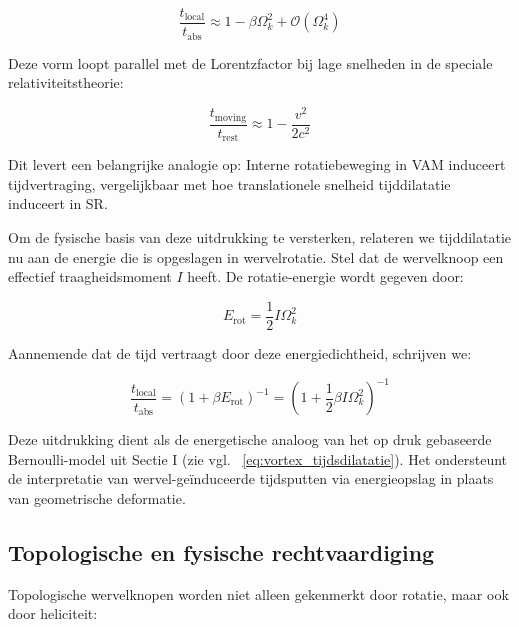 \begin{equation}
\frac{t_{\text{local}}}{t_{\text{abs}}} \approx 1 - \beta \Omega_k^2 + \mathcal{O}(\Omega_k^4)\label{eq:rotational_induced_time_dilation_expansion}
\end{equation}

Deze vorm loopt parallel met de Lorentzfactor bij lage snelheden in de speciale relativiteitstheorie:

\begin{equation}
\frac{t_{\text{moving}}}{t_{\text{rest}}} \approx 1 - \frac{v^2}{2c^2}\label{eq:parallels_lorentz_time_dilation}
\end{equation}

Dit levert een belangrijke analogie op: Interne rotatiebeweging in VAM induceert tijdvertraging, vergelijkbaar met hoe translationele snelheid tijddilatatie induceert in SR.

Om de fysische basis van deze uitdrukking te versterken, relateren we tijddilatatie nu aan de energie die is opgeslagen in wervelrotatie. Stel dat de wervelknoop een effectief traagheidsmoment $I$ heeft. De rotatie-energie wordt gegeven door:

\begin{equation}
E_{\text{rot}} = \frac{1}{2} I \Omega_k^2\label{eq:rotational_energy_inertia}
\end{equation}

Aannemende dat de tijd vertraagt door deze energiedichtheid, schrijven we:

\begin{equation}
\frac{t_{\text{local}}}{t_{\text{abs}}} = \left(1 + \beta E_{\text{rot}} \right)^{-1} = \left(1 + \frac{1}{2} \beta I \Omega_k^2 \right)^{-1}\label{eq:time_dilation_rotational_energy_inertia}
\end{equation}

Deze uitdrukking dient als de energetische analoog van het op druk gebaseerde Bernoulli-model uit Sectie I (zie vgl. ~\eqref{eq:vortex_tijdsdilatatie}). Het ondersteunt de interpretatie van wervel-geïnduceerde tijdsputten via energieopslag in plaats van geometrische deformatie.

\subsection{Topologische en fysische rechtvaardiging}

Topologische wervelknopen worden niet alleen gekenmerkt door rotatie, maar ook door heliciteit:

